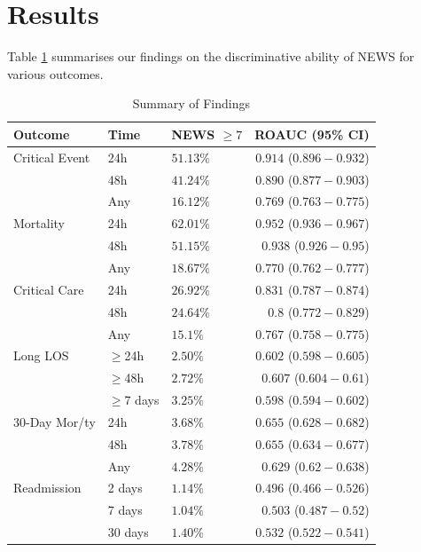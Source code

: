 \documentclass[10pt,journal, compsoc]{IEEEtran}
\begin{document}
\section{Results}
Table \ref{tab:result_summary} summarises our findings on the discriminative ability of NEWS for various outcomes.
\begin{table}[!t]
    \renewcommand{\arraystretch}{1.3}
    \centering
    \caption{Summary of Findings}
    \label{tab:result_summary}
    \begin{tabular}{lllr}
        \toprule
        Outcome        & Time         & NEWS $\geq 7$ & ROAUC (95\% CI)              \\
        \midrule
        Critical Event & 24h          & $51.13\%$     & $\bm{0.914}$ ($0.896-0.932$) \\
                       & 48h          & $41.24\%$     & $0.890$ ($0.877-0.903$)      \\
                       & Any          & $16.12\%$     & $0.769$ ($0.763-0.775$)      \\
        \hline
        Mortality      & 24h          & $62.01\%$     & $\bm{0.952}$ ($0.936-0.967$) \\
                       & 48h          & $51.15\%$     & $0.938$ ($0.926-0.95$)       \\
                       & Any          & $18.67\%$     & $0.770$ ($0.762-0.777$)      \\
        \hline
        Critical Care  & 24h          & $26.92\%$     & $\bm{0.831}$ ($0.787-0.874$) \\
                       & 48h          & $24.64\%$     & $0.8$ ($0.772-0.829$)        \\
                       & Any          & $15.1\%$      & $0.767$ ($0.758-0.775$)      \\
        \hline
        Long LOS       & $\geq$24h    & $2.50\%$      & $0.602$ ($0.598-0.605$)      \\
                       & $\geq$48h    & $2.72\%$      & $\bm{0.607}$ ($0.604-0.61$)  \\
                       & $\geq$7 days & $3.25\%$      & $0.598$ ($0.594-0.602$)      \\
        \hline
        30-Day Mor/ty  & 24h          & $3.68\%$      & $\bm{0.655}$ ($0.628-0.682$) \\
                       & 48h          & $3.78\%$      & $0.655$ ($0.634-0.677$)      \\
                       & Any          & $4.28\%$      & $0.629$ ($0.62-0.638$)       \\
        \hline
        Readmission    & 2 days       & $1.14\%$      & $0.496$ ($0.466-0.526$)      \\
                       & 7 days       & $1.04\%$      & $0.503$ ($0.487-0.52$)       \\
                       & 30 days      & $1.40\%$      & $\bm{0.532}$ ($0.522-0.541$) \\
        \bottomrule
    \end{tabular}
\end{table}
\end{document}
